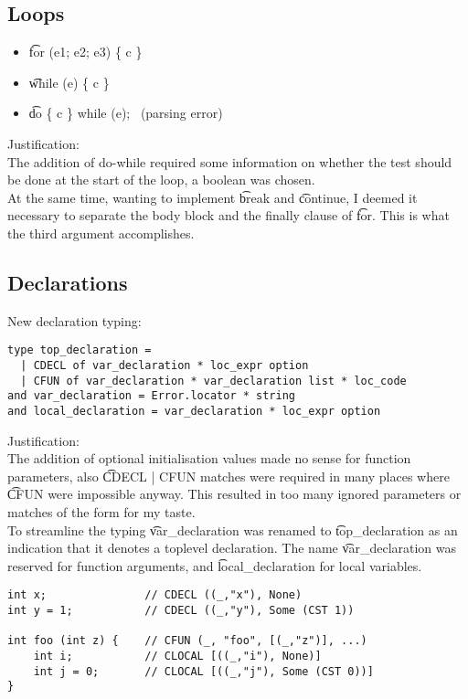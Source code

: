 \subsection{Loops}
\begin{itemize}
    \item \t{for (e1; e2; e3) \{ c \}}
    \not\to\ 
    \to\ 
    \item \t{while (e) \{ c \}}
    \not\to\ 
    \to\ 
    \item \t{do \{ c \} while (e);}
    \not\to\ (parsing error)
    \to\ 
\end{itemize}
Justification:\\
The addition of do-while required some information on whether the test should be done at the start of the loop, a boolean was chosen.\\
At the same time, wanting to implement \t{break} and \t{continue}, I deemed it necessary to separate the body block and the finally clause of \t{for}. This is what the third argument accomplishes.

\subsection{Declarations}
New declaration typing:
\begin{verbatim}
type top_declaration =
  | CDECL of var_declaration * loc_expr option
  | CFUN of var_declaration * var_declaration list * loc_code
and var_declaration = Error.locator * string
and local_declaration = var_declaration * loc_expr option
\end{verbatim}

Justification:\\
The addition of optional initialisation values made no sense for function parameters, also \t{CDECL | CFUN} matches were required in many places where \t{CFUN} were impossible anyway. This resulted in too many ignored parameters or matches of the form  for my taste.\\
To streamline the typing \t{var\_declaration} was renamed to \t{top\_declaration} as an indication that it denotes a toplevel declaration. The name \t{var\_declaration} was reserved for function arguments, and \t{local\_declaration} for local variables.

\begin{verbatim}
int x;               // CDECL ((_,"x"), None)
int y = 1;           // CDECL ((_,"y"), Some (CST 1))

int foo (int z) {    // CFUN (_, "foo", [(_,"z")], ...)
    int i;           // CLOCAL [((_,"i"), None)]
    int j = 0;       // CLOCAL [((_,"j"), Some (CST 0))]
}
\end{verbatim}
